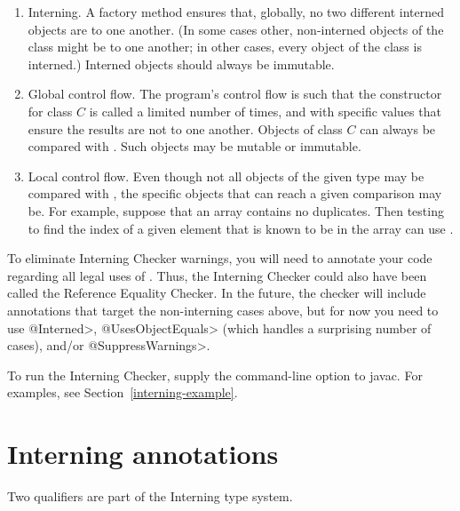 \begin{enumerate}
\item
  Interning.  A factory method ensures that, globally, no two different
  interned objects are  to one another.  (In some cases
  other, non-interned objects of the class might be  to one
  another; in other cases, every object of the class is interned.)
  Interned objects should always be immutable.
\item
  Global control flow.  The program's control flow is such that the
  constructor for class $C$ is called a limited number of times, and with
  specific values that ensure the results are not  to one
  another.  Objects of class $C$ can always be compared with \code{==}.
  Such objects may be mutable or immutable.
\item
  Local control flow.  Even though not all objects of the given type may be
  compared with \code{==}, the specific objects that can reach a given
  comparison may be.  For example, suppose that an array contains no
  duplicates.  Then testing to find the index of a given element that is
  known to be in the array can use \code{==}.
\end{enumerate}

To eliminate Interning Checker warnings, you will need to annotate your
code regarding all legal uses of \code{==}.  Thus, the Interning Checker
could also have been called the Reference Equality Checker.  In the
future, the checker will include annotations that target the non-interning
cases above, but for now you need to use \<@Interned>, \<@UsesObjectEquals>
(which handles a surprising number of cases), and/or
\<@SuppressWarnings>.

To run the Interning Checker, supply the  command-line option to javac.  For
examples, see Section~\ref{interning-example}.


\section{Interning annotations\label{interning-annotations}}

Two qualifiers are part of the Interning type system.

